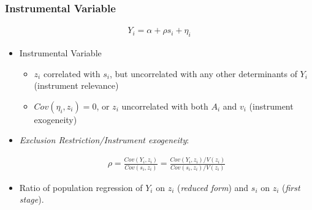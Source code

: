 \documentclass[pdftex]{beamer}
\begin{document}
\begin{frame}
\frametitle{Instrumental Variable}
\begin{eqnarray*}
  Y_{i} = \alpha+ \rho s_{i}+\eta_{i}
\end{eqnarray*}
\begin{itemize}
\item Instrumental Variable
\begin {itemize}
    \item $z_{i}$ correlated with $s_{i}$, but uncorrelated with any other determinants of $Y_{i}$ (instrument relevance)
    \item $Cov\left(\eta_{i}, z_{i}\right)=0$, or $z_{i}$ uncorrelated with both $A_{i}$ and $v_{i}$ (instrument exogeneity)
\end {itemize}

\item \emph{Exclusion Restriction/Instrument exogeneity}:

\begin{eqnarray*}
  \rho=\frac{Cov\left(Y_{i}, z_{i}\right)}{Cov\left(s_{i}, z_{i}\right)} = \frac{Cov\left(Y_{i}, z_{i}\right)/V\left(z_{i}\right)}{Cov\left(s_{i}, z_{i}\right)/V\left(z_{i}\right)}
\end{eqnarray*}

\item Ratio of population regression of $Y_{i}$ on $z_{i}$ (\emph{reduced form}) and $s_{i}$ on $z_{i}$ (\emph{first stage}).

\end{itemize}
\end{frame}




\end{document}
